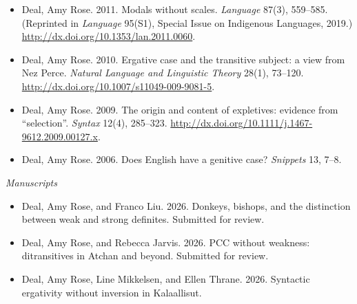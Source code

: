 \documentclass[12pt]{article}
\begin{document}
\begin{itemize}[labelsep=.5cm,leftmargin=0cm,itemindent=0cm]
  \item Deal, Amy Rose. 2011. {Modals without scales.} \textit{Language} 87(3), 559--585. \\
(Reprinted in \emph{Language} 95(S1), Special Issue on Indigenous Languages, 2019.)
\href{http://dx.doi.org/10.1353/lan.2011.0060}{http://dx.doi.org/10.1353/lan.2011.0060}.

  \item Deal, Amy Rose. 2010.  {Ergative case and the transitive subject: a view from Nez Perce.} \textit{Natural Language and Linguistic Theory} 28(1), 73--120.  \newline \href{http://dx.doi.org/10.1007/s11049-009-9081-5}{http://dx.doi.org/10.1007/s11049-009-9081-5}. 

  \item Deal, Amy Rose. 2009.  {The origin and content of expletives: evidence from ``selection''.} \textit{Syntax} 12(4), 285--323.  \href{http://dx.doi.org/10.1111/j.1467-9612.2009.00127.x}{http://dx.doi.org/10.1111/j.1467-9612.2009.00127.x}.

\item
Deal, Amy Rose. 2006. Does English have a genitive case? \emph{Snippets} 13, 7--8.


\end{itemize}%

\bigskip


\noindent\emph{Manuscripts \vspace{0.05in}}

\begin{itemize}[labelsep=.5cm,leftmargin=0cm,itemindent=0cm]
\item Deal, Amy Rose, and Franco Liu. 2026. Donkeys, bishops, and the distinction between weak and strong definites. Submitted for review.

\item Deal, Amy Rose, and Rebecca Jarvis. 2026. PCC without weakness: ditransitives in Atchan and beyond. Submitted for review.

\item  Deal, Amy Rose, Line Mikkelsen, and Ellen Thrane. 2026. Syntactic ergativity without inversion in Kalaallisut. 

\end{itemize}
\end{document}
